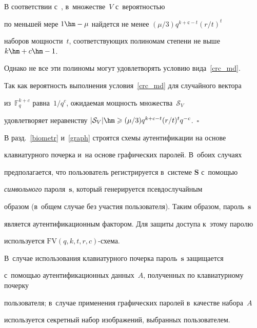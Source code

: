 В соответствии с~\cite[лемма~4]{Jue2006}, в~множестве~$V$ с~вероятностью 


по меньшей мере $1\hm-\mu$ найдется не менее $({\mu}/{3})q^{k+с-t}(r/t)^t$ 


наборов мощности~$t$, соответствующих полиномам степени не выше $k\hm+c\hm-1$. 


Однако не все эти полиномы могут удовлетворять условию вида~\eqref{crc_md}. 


Так как вероятность выполнения условия~\eqref{crc_md} для случайного вектора 


из~$\mathbb{F}^{k+c}_q$ равна~$1/q^{c}$, ожидаемая мощность множества~$\mathcal{S}_{V}$ 


удовлетворяет неравенству $|\mathcal{S}_{V}|\hm\geqslant 


({\mu}/{3})q^{k+c-t}(r/t)^t q^{-c}$.~\hfill$\square$





\smallskip





В разд.~\ref{biometr} и~\ref{graph} строятся схемы аутентификации на основе 


клавиатурного почерка и~на основе графических паролей. В~обоих случаях 


предполагается, что пользователь регистрируется в~системе $\mathbf{S}$ с~по\-мощью 


\textit{символьного} пароля~$\mathbf{s}$, который генерируется псевдослучайным 


образом (в~общем случае без участия пользователя). Таким образом, пароль~$\mathbf{s}$ 


является аутентификационным фактором. Для защиты доступа к~этому паролю 


используется $\mathrm{FV}(q,k,t,r,c)$-схе\-ма. 


В~случае использования клавиатурного почерка пароль~$\mathbf{s}$ защищается 


с~по\-мощью аутентификационных данных~$A$, полученных по клавиатурному почерку 


пользователя; в~случае применения графических паролей в~качестве набора~$A$ 


используется секретный набор изображений, выбранных пользователем.


{





}











